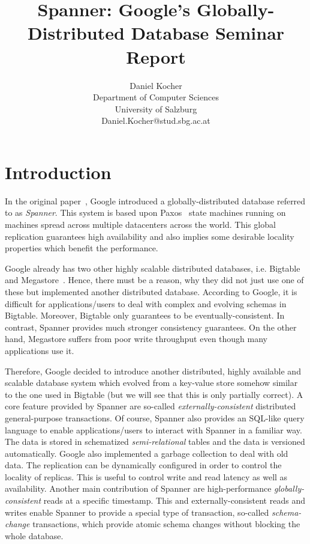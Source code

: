 \documentclass[onecolumn, a4paper, 10pt]{article}
\begin{document}
\title{
  Spanner: Google's Globally-Distributed Database \newline
  Seminar Report
}

\author{
  Daniel Kocher \\
  Department of Computer Sciences \\
  University of Salzburg \\                                                    
  Daniel.Kocher@stud.sbg.ac.at
}

\maketitle

\section{Introduction}
\label{sec:introduction}

In the original paper~\cite{Corbett:2012}, Google introduced a
globally-distributed database referred to as \emph{Spanner}. This system is based
upon Paxos~\cite{Lamport:1998} state machines running on machines spread across
multiple datacenters across the world. This global replication guarantees high
availability and also implies some desirable locality properties which benefit
the performance.

Google already has two other highly scalable distributed databases, i.e.
Bigtable~\cite{Chang:2008} and Megastore~\cite{Baker:2011}. Hence, there must be
a reason, why they did not just use one of these but implemented another
distributed database. According to Google, it is difficult for applications/users
to deal with complex and evolving schemas in Bigtable. Moreover, Bigtable only
guarantees to be eventually-consistent. In contrast, Spanner provides much
stronger consistency guarantees. On the other hand, Megastore suffers from poor
write throughput even though many applications use it.

Therefore, Google decided to introduce another distributed, highly available and
scalable database system which evolved from a key-value store somehow similar to
the one used in Bigtable (but we will see that this is only partially correct).
A core feature provided by Spanner are so-called \emph{externally-consistent}
distributed general-purpose transactions. Of course, Spanner also provides an
SQL-like query language to enable applications/users to interact with Spanner in
a familiar way. The data is stored in schematized \emph{semi-relational} tables
and the data is versioned automatically. Google also implemented a garbage
collection to deal with old data. The replication can be dynamically configured
in order to control the locality of replicas. This is useful to control write
and read latency as well as availability. Another main contribution of Spanner
are high-performance \emph{globally-consistent} reads at a specific timestamp.
This and externally-consistent reads and writes enable Spanner to provide a
special type of transaction, so-called \emph{schema-change} transactions, which
provide atomic schema changes without blocking the whole database.
\end{document}
